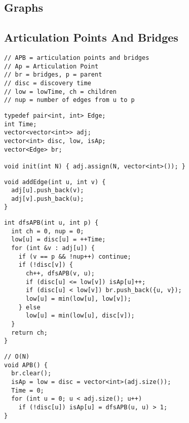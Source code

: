 \documentclass[twoside]{article}
\begin{document}
\begin{multicols*}{2}
\sectionfont{\bfseries\sffamily\centering\Huge}
\vspace{1em}
\section*{Graphs}
\vspace{3em}
\subsectionfont{\large\bfseries\sffamily\underline}
\subsection*{Articulation Points And Bridges}
\begin{verbatim}
// APB = articulation points and bridges
// Ap = Articulation Point
// br = bridges, p = parent
// disc = discovery time
// low = lowTime, ch = children
// nup = number of edges from u to p
\end{verbatim}
\vspace{-12pt}
\begin{verbatim}
typedef pair<int, int> Edge;
int Time;
vector<vector<int>> adj;
vector<int> disc, low, isAp;
vector<Edge> br;

void init(int N) { adj.assign(N, vector<int>()); }
\end{verbatim}
\vspace{-12pt}
\begin{verbatim}
void addEdge(int u, int v) {
  adj[u].push_back(v);
  adj[v].push_back(u);
}
\end{verbatim}
\vspace{-12pt}
\begin{verbatim}
int dfsAPB(int u, int p) {
  int ch = 0, nup = 0;
  low[u] = disc[u] = ++Time;
  for (int &v : adj[u]) {
    if (v == p && !nup++) continue;
    if (!disc[v]) {
      ch++, dfsAPB(v, u);
      if (disc[u] <= low[v]) isAp[u]++;
      if (disc[u] < low[v]) br.push_back({u, v});
      low[u] = min(low[u], low[v]);
    } else
      low[u] = min(low[u], disc[v]);
  }
  return ch;
}
\end{verbatim}
\vspace{-12pt}
\begin{verbatim}
// O(N)
void APB() {
  br.clear();
  isAp = low = disc = vector<int>(adj.size());
  Time = 0;
  for (int u = 0; u < adj.size(); u++)
    if (!disc[u]) isAp[u] = dfsAPB(u, u) > 1;
}
\end{verbatim}


\end{multicols*}
\end{document}
